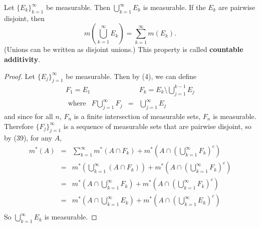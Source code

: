 \begin{pblm}%
	Let $\{E_k\}_{k=1}^\infty$ be measurable. Then 
	$\bigcup\limits_{k=1}^\infty E_k$ is measurable. If the $E_k$ are 
	pairwise disjoint, then 
	\begin{equation*}
		m\left(\bigcup\limits_{k=1}^\infty E_k\right)
		= \sum\limits_{k=1}^\infty m(E_k).
	\end{equation*}
	(Unions can be written as disjoint unions.) This property is called 
	\textbf{countable additivity}. 
\begin{proof}
	Let $\{E_j\}_{j=1}^\infty$ be measurable. Then by (4), we can define 
	\begin{equation*}
	\begin{array}{rcl}
		F_1 = E_1 & & F_k = E_k \setminus \bigcup\limits_{j=1}^{k-1}E_j \\
		\text{ where }~~ F\bigcup\limits_{j=1}^\infty F_j & = & \bigcup\limits_{j=1}^\infty E_j
	\end{array}
	\end{equation*}
	and since for all $n$, $F_n$ is a finite intersection of measurable sets, $F_n$ 
	is measurable. Therefore $\{F_j\}_{j=1}^\infty$ is a sequence of measurable sets 
	that are pairwise disjoint, so by (39), for any $A$, 
	\begin{equation*}
	\begin{array}{rcl}
		m^\ast(A) & = & \sum\limits_{k=1}^\infty m^\ast(A\cap F_k) + 
				m^\ast\left(A\cap\left(\bigcup\limits_{k=1}^\infty F_k\right)^c\right)\\
			 & = & m^\ast\left(\bigcup\limits_{k=1}^\infty (A\cap F_k)\right) + 
				m^\ast\left(A\cap\left(\bigcup\limits_{k=1}^\infty F_k\right)^c\right)\\
			 & = & m^\ast\left(A\cap\bigcup\limits_{k=1}^\infty F_k\right) + 
				m^\ast\left(A\cap\left(\bigcup\limits_{k=1}^\infty F_k\right)^c\right)\\
			 & = & m^\ast\left(A\cap\bigcup\limits_{k=1}^\infty E_k\right) + 
				m^\ast\left(A\cap\left(\bigcup\limits_{k=1}^\infty E_k\right)^c\right)\\
	\end{array}
	\end{equation*}
	So $\bigcup\limits_{k=1}^\infty E_k$ is measurable. 


\end{proof}
\end{pblm}
